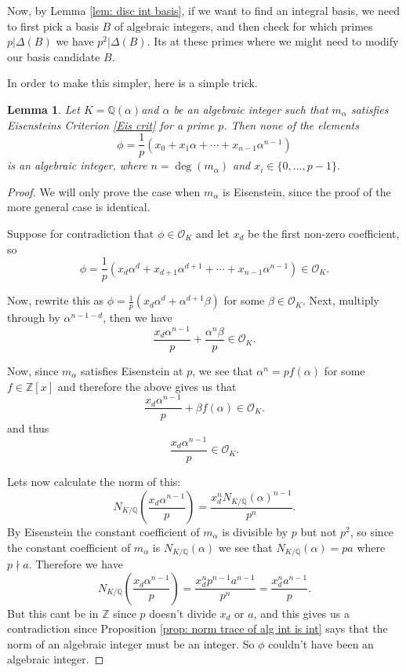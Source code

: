 \documentclass[11pt,a4paper]{report}
\theoremstyle{plain}
\newtheorem{lem}[subsection]{Lemma}
\theoremstyle{definition}
\theoremstyle{definition}
\newcommand{\ZZ}{\mathbb{Z}}
\def\QQ{\mathbb{Q}}
\def \a{\alpha}
\def \OO {\mathcal{O}}
\begin{document}
Now, by Lemma \ref{lem: disc int basis}, if we want to find an integral basis, we need to first pick a basis $B$ of algebraic integers, and then check for which primes $p|\Delta(B)$ we have $p^2| \Delta(B)$. Its at these primes where we might need to modify our basis candidate $B$.

In order to make this simpler, here is a simple trick.

\begin{lem}\label{lem: eis crit and alg ints}
	Let $K=\QQ(\a)$and $\a$ be an algebraic integer such that $m_\a$ satisfies Eisensteins Criterion \ref{Eis crit} for a prime $p$. Then none of the elements \[\phi=\frac{1}{p}(x_0+x_1\a+\cdots+x_{n-1}\a^{n-1})\] is an algebraic integer, where $n=\deg(m_\a)$ and $x_i \in \{0,\dots,p-1\}.$
\end{lem} 


\begin{proof}
	We will only prove the case when $m_\a$ is Eisenstein, since the proof of the more general case is identical.	
	
	Suppose for contradiction that $\phi \in \OO_K$ and let $x_d$ be the first non-zero coefficient, so \[\phi=\frac{1}{p}(x_d\a^d+x_{d+1}\a^{d+1}+\cdots+x_{n-1}\a^{n-1}) \in \OO_K.\]
	
	Now, rewrite this as $\phi=\frac{1}{p}(x_d\a^d +\a^{d+1}\beta)$ for some $\beta \in \OO_K$. Next, multiply through by $\a^{n-1-d}$, then we have \[\frac{x_d\a^{n-1}}{p}+\frac{\a^n\beta}{p} \in \OO_K.\]
	
	Now, since  $m_\a$ satisfies Eisenstein at $p$, we see that $\a^n=pf(\a)$ for some $f \in \ZZ[x]$ and therefore the above gives us that \[\frac{x_d\a^{n-1}}{p}+\beta f(\a) \in \OO_K.\] and thus \[\frac{x_d\a^{n-1}}{p} \in \OO_K.\]
	
	Lets now calculate the norm of this: \[N_{K/\QQ} \left(\frac{x_d\a^{n-1}}{p} \right)=\frac{x_d^n N_{K/\QQ}(\a)^{n-1}}{p^n}.\] By Eisenstein the constant coefficient of $m_\a$ is divisible by $p$ but not $p^2$, so since the constant coefficient of $m_\a$ is $N_{K/\QQ}(\a)$ we see that $N_{K/\QQ}(\a)=p a$ where $p \nmid a$. Therefore we have \[N_{K/\QQ} \left(\frac{x_d\a^{n-1}}{p} \right)=\frac{x_d^n p^{n-1}a^{n-1}}{p^n}= \frac{x_d^n a^{n-1}}{p}.\] But this cant be in $\ZZ$ since $p$ doesn't divide $x_d$ or $a$, and this gives us a contradiction since  Proposition \ref{prop: norm trace of alg int is int} says that the norm of an algebraic integer must be an integer. So $\phi$ couldn't have been an algebraic integer. 
	
	
\end{proof}
\end{document}

